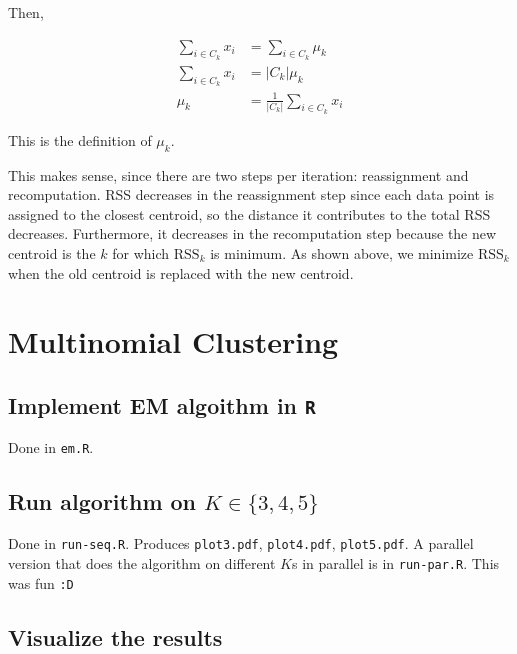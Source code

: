 \documentclass[11pt]{scrartcl}
\begin{document}
Then,

\begin{align*}
\sum_{i \in C_k} x_i &= \sum_{i \in C_k} \mu_k \\
\sum_{i \in C_k} x_i &= |C_k| \mu_k \\
\mu_k &= \frac{1}{|C_k|} \sum_{i \in C_k} x_i 
\end{align*}

This is the definition of $\mu_k$.

This makes sense, since there are two steps per iteration: reassignment and recomputation. RSS decreases in the reassignment step since each data point is assigned to the closest centroid, so the distance it contributes to the total RSS decreases. Furthermore, it decreases in the recomputation step because the new centroid is the $k$ for which $\mathrm{RSS}_k$ is minimum. As shown above, we minimize $\mathrm{RSS}_k$ when the old centroid is replaced with the new centroid.

\section{Multinomial Clustering}

\subsection{Implement EM algoithm in \texttt{R}}

Done in \texttt{em.R}.

\subsection{Run algorithm on $K \in \{3, 4, 5\}$}

Done in \texttt{run-seq.R}. Produces \texttt{plot3.pdf}, \texttt{plot4.pdf}, \texttt{plot5.pdf}. A parallel version that does the algorithm on different $K$s in parallel is in \texttt{run-par.R}. This was fun \texttt{:D}

\subsection{Visualize the results}
\end{document}
